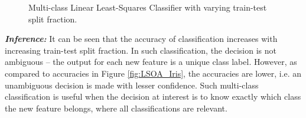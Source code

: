 \documentclass[12pt, a4 paper]{article}
\begin{document}
\begin{figure}
\centering
{}

\caption{Multi-class Linear Least-Squares Classifier with varying train-test split fraction.}
\label{fig:LSMC_Iris}
\end{figure}

{\it \bfseries Inference:} It can be seen that the accuracy of classification increases with increasing train-test split fraction. In such classification, the decision is not ambiguous -- the output for each new feature is a unique class label. However, as compared to accuracies in Figure \ref{fig:LSOA_Iris}, the accuracies are lower, i.e. an unambiguous decision is made with lesser confidence. Such multi-class classification is useful when the decision at interest is to know exactly which class the new feature belongs, where all classifications are relevant.
\end{document}
